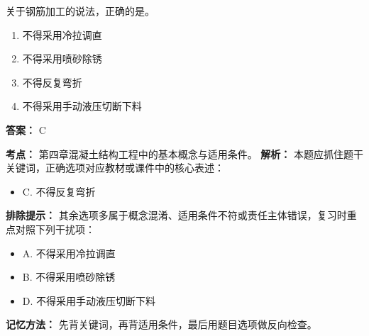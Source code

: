 \documentclass[UTF8,fontset=fandol,11pt]{ctexart}
\begin{document}
\begin{quizbox}[title={第 31 题}]
关于钢筋加工的说法，正确的是。\\
\begin{enumerate}[label=\Alph*.]
\item 不得采用冷拉调直
\item 不得采用喷砂除锈
\item 不得反复弯折
\item 不得采用手动液压切断下料
\end{enumerate}
\textbf{答案：} C
\vspace{0.25em}
\begin{answerbox}[title={考点解析}]
\textbf{考点：} 第四章混凝土结构工程中的基本概念与适用条件。
\textbf{解析：} 本题应抓住题干关键词，正确选项对应教材或课件中的核心表述：
\begin{itemize}
\item C. 不得反复弯折
\end{itemize}
\textbf{排除提示：} 其余选项多属于概念混淆、适用条件不符或责任主体错误，复习时重点对照下列干扰项：
\begin{itemize}
\item A. 不得采用冷拉调直
\item B. 不得采用喷砂除锈
\item D. 不得采用手动液压切断下料
\end{itemize}
\textbf{记忆方法：} 先背关键词，再背适用条件，最后用题目选项做反向检查。
\end{answerbox}
\end{quizbox}

\vspace{0.2em}
\end{document}
